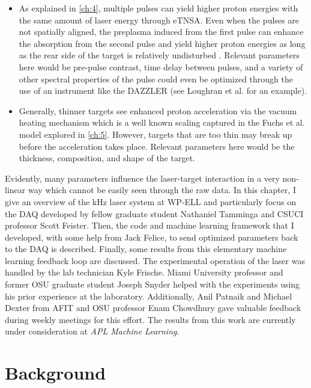 \begin{itemize}
\item As explained in \autoref{ch:4}, multiple pulses can yield higher proton energies with the same amount of laser energy through \gls{eTNSA}. Even when the pulses are not spatially aligned, the preplasma induced from the first pulse can enhance the absorption from the second pulse and yield higher proton energies as long as the rear side of the target is relatively undisturbed \cite{Macchi_2013_RevModPhys}. Relevant parameters here would be pre-pulse contrast, time delay between pulses, and a variety of other spectral properties of the pulse could even be optimized through the use of an instrument like the DAZZLER (see Loughran et al. \cite{Loughran_2023_HPLSE} for an example). 

\item Generally, thinner targets see enhanced proton acceleration via the vacuum heating mechanism which is a well known scaling captured in the Fuchs et al. \cite{Fuchs_2005_Nat} model explored in \autoref{ch:5}. However, targets that are too thin may break up before the acceleration takes place. Relevant parameters here would be the thickness, composition, and shape of the target. 
\end{itemize}
Evidently, many parameters influence the laser-target interaction in a very non-linear way which cannot be easily seen through the raw data. In this chapter, I give an overview of the kHz laser system at \gls{WP-ELL} and particularly focus on the \gls{DAQ} developed by fellow graduate student Nathaniel Tamminga and \gls{CSUCI} professor Scott Feister. Then, the code and machine learning framework that I developed, with some help from Jack Felice, to send optimized parameters back to the \gls{DAQ} is described. Finally, some results from this elementary machine learning feedback loop are discussed. The experimental operation of the laser was handled by the lab technician Kyle Frische. Miami University professor and former OSU graduate student Joseph Snyder helped with the experiments using his prior experience at the laboratory. Additionally, Anil Patnaik and Michael Dexter from AFIT and OSU professor Enam Chowdhury gave valuable feedback during weekly meetings for this effort. The results from this work are currently under consideration at \emph{APL Machine Learning}.

\section{Background} \label{sec:lab_background}

